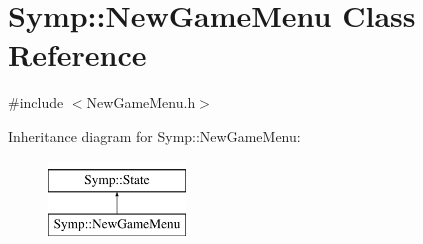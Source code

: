 \hypertarget{class_symp_1_1_new_game_menu}{\section{Symp\-:\-:New\-Game\-Menu Class Reference}
\label{class_symp_1_1_new_game_menu}
}


{\ttfamily \#include $<$New\-Game\-Menu.\-h$>$}

Inheritance diagram for Symp\-:\-:New\-Game\-Menu\-:\begin{figure}[H]
\begin{center}
\leavevmode
\includegraphics[height=2.000000cm]{class_symp_1_1_new_game_menu}
\end{center}
\end{figure}
